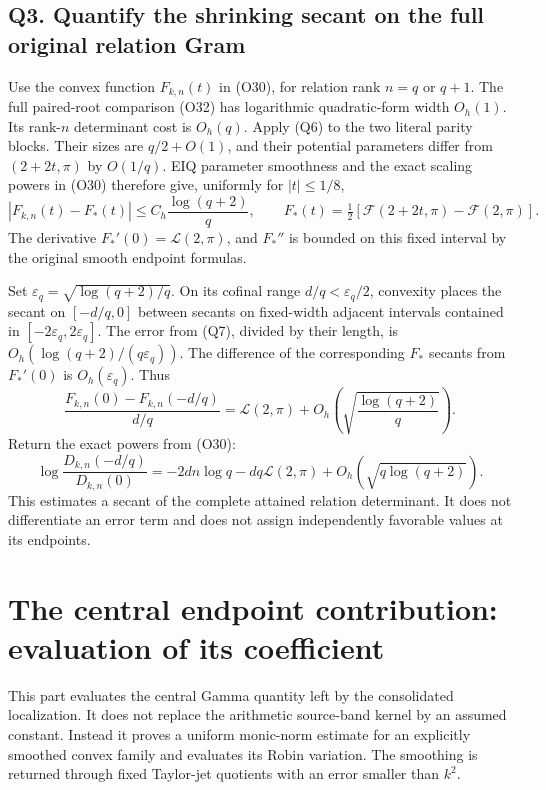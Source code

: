\documentclass[
  11pt,
]{article}
\begin{document}
\subsection{Q3. Quantify the shrinking secant on the full original
relation
Gram}\label{q3.-quantify-the-shrinking-secant-on-the-full-original-relation-gram}

Use the convex function \(F_{k,n}(t)\) in (O30), for relation rank
\(n=q\) or \(q+1\). The full paired-root comparison (O32) has
logarithmic quadratic-form width \(O_h(1)\). Its rank-\(n\) determinant
cost is \(O_h(q)\). Apply (Q6) to the two literal parity blocks. Their
sizes are \(q/2+O(1)\), and their potential parameters differ from
\((2+2t,\pi)\) by \(O(1/q)\). EIQ parameter smoothness and the exact
scaling powers in (O30) therefore give, uniformly for \(|t|\le1/8\), \[
\boxed{\left|F_{k,n}(t)-F_*(t)\right|\le C_h\frac{\log(q+2)}q,
\qquad
F_*(t)=\tfrac12[\mathcal F(2+2t,\pi)-\mathcal F(2,\pi)].}
\tag{Q7}
\] The derivative \(F_*'(0)=\mathcal L(2,\pi)\), and \(F_*''\) is
bounded on this fixed interval by the original smooth endpoint formulas.

Set \(\varepsilon_q=\sqrt{\log(q+2)/q}\). On its cofinal range
\(d/q<\varepsilon_q/2\), convexity places the secant on \([-d/q,0]\)
between secants on fixed-width adjacent intervals contained in
\([-2\varepsilon_q,2\varepsilon_q]\). The error from (Q7), divided by
their length, is \(O_h(\log(q+2)/(q\varepsilon_q))\). The difference of
the corresponding \(F_*\) secants from \(F_*'(0)\) is
\(O_h(\varepsilon_q)\). Thus \[
\frac{F_{k,n}(0)-F_{k,n}(-d/q)}{d/q}
=\mathcal L(2,\pi)+O_h\!\left(\sqrt{\frac{\log(q+2)}q}\right).
\] Return the exact powers from (O30): \[
\boxed{\log\frac{D_{k,n}(-d/q)}{D_{k,n}(0)}
=-2dn\log q-dq\mathcal L(2,\pi)
+O_h(\sqrt{q\log(q+2)}).}
\tag{Q8}
\] This estimates a secant of the complete attained relation
determinant. It does not differentiate an error term and does not assign
independently favorable values at its endpoints.

\newpage

\section{The central endpoint contribution: evaluation of its
coefficient}\label{the-central-endpoint-contribution-evaluation-of-its-coefficient}

This part evaluates the central Gamma quantity left by the consolidated
localization. It does not replace the arithmetic source-band kernel by
an assumed constant. Instead it proves a uniform monic-norm estimate for
an explicitly smoothed convex family and evaluates its Robin variation.
The smoothing is returned through fixed Taylor-jet quotients with an
error smaller than \(k^2\).
\end{document}
